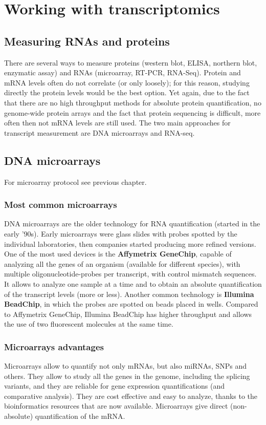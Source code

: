 \graphicspath{{chapters/images/02/}}

\chapter{Working with transcriptomics}

  \section{Measuring RNAs and proteins}
    There are several ways to measure proteins (western blot, ELISA, northern blot, enzymatic assay) and RNAs (microarray, RT-PCR, RNA-Seq). Protein and mRNA levels often do not correlate (or only loosely); for this reason, studying directly the protein levels would be the best option. Yet again, due to the fact that there are no high throughput methods for absolute protein quantification, no genome-wide protein arrays and the fact that protein sequencing is difficult, more often then not mRNA levels are still used. The two main approaches for transcript measurement are DNA microarrays and RNA-seq. 

  \section{DNA microarrays}
    For microarray protocol see previous chapter.

    \subsection{Most common microarrays}
      DNA microarrays are the older technology for RNA quantification (started in the early '90s). Early microarrays were glass slides with probes spotted by the individual laboratories, then companies started producing more refined versions. One of the most used devices is the \textbf{Affymetrix GeneChip}, capable of analyzing all the genes of an organism (available for different species), with multiple oligonucleotide-probes per transcript, with control mismatch sequences. It allows to analyze one sample at a time and to obtain an absolute quantification of the transcript levels (more or less). Another common technology is \textbf{Illumina BeadChip}, in which the probes are spotted on beads placed in wells. Compared to Affymetrix GeneChip, Illumina BeadChip has higher throughput and allows the use of two fluorescent molecules at the same time.
    
    \subsection{Microarrays advantages}
      Microarrays allow to quantify not only mRNAs, but also miRNAs, SNPs and others. They allow to study all the genes in the genome, including the splicing variants, and they are reliable for gene expression quantifications (and comparative analysis). They are cost effective and easy to analyze, thanks to the bioinformatics resources that are now available. Microarrays give direct (non-absolute) quantification of the mRNA.

